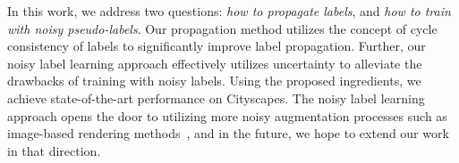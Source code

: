 
In this work, we address two questions: \emph{how to propagate labels}, and \emph{how to train with noisy pseudo-labels}. Our propagation method utilizes the concept of cycle consistency of labels to significantly improve label propagation. Further, our noisy label learning approach effectively utilizes uncertainty to alleviate the drawbacks of training with noisy labels. Using the proposed ingredients, we achieve state-of-the-art performance on Cityscapes. The noisy label learning approach opens the door to utilizing more noisy augmentation processes such as image-based rendering methods~\cite{}, and in the future, we hope to extend our work in that direction.
